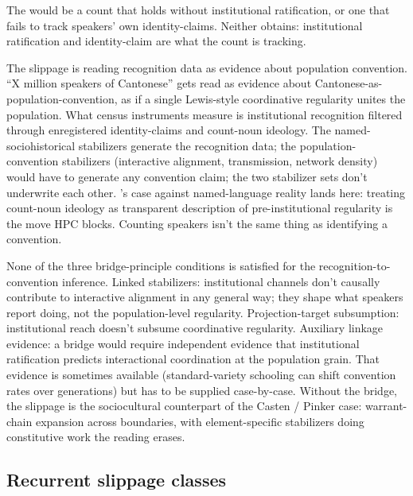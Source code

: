 \documentclass[12pt]{article}
\begin{document}
The  would be a count that holds without institutional ratification, or one that fails to track speakers' own identity-claims. Neither obtains: institutional ratification and identity-claim are what the count is tracking.

The slippage is reading recognition data as evidence about population convention. \enquote{X million speakers of Cantonese} gets read as evidence about Cantonese-as-population-convention, as if a single Lewis-style coordinative regularity unites the population. What census instruments measure is institutional recognition filtered through enregistered identity-claims and count-noun ideology. The named-sociohistorical stabilizers generate the recognition data; the population-convention stabilizers (interactive alignment, transmission, network density) would have to generate any convention claim; the two stabilizer sets don't underwrite each other. \citeauthor{pennycook2010}'s case against named-language reality lands here: treating count-noun ideology as transparent description of pre-institutional regularity is the move HPC blocks. Counting speakers isn't the same thing as identifying a convention.

None of the three bridge-principle conditions is satisfied for the recognition-to-convention inference. Linked stabilizers: institutional channels don't causally contribute to interactive alignment in any general way; they shape what speakers report doing, not the population-level regularity. Projection-target subsumption: institutional reach doesn't subsume coordinative regularity. Auxiliary linkage evidence: a bridge would require independent evidence that institutional ratification predicts interactional coordination at the population grain. That evidence is sometimes available (standard-variety schooling can shift convention rates over generations) but has to be supplied case-by-case. Without the bridge, the slippage is the sociocultural counterpart of the Casten / Pinker case: warrant-chain expansion across boundaries, with element-specific stabilizers doing constitutive work the reading erases.

\subsection{Recurrent slippage classes}\label{sec:slippage-classes}
\end{document}
